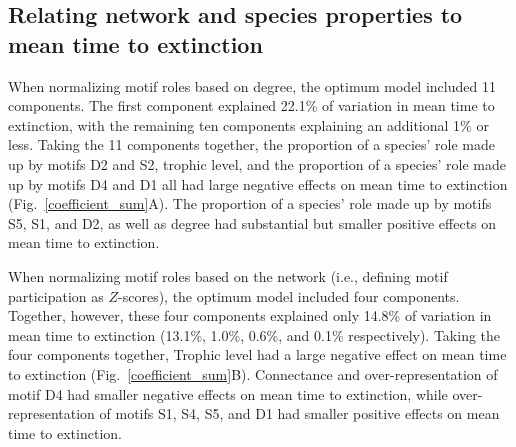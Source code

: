 \documentclass[12pt]{article}
\begin{document}
	\subsection*{Relating network and species properties to mean time to extinction}

		When normalizing motif roles based on degree, the optimum model included 11 components.
		The first component explained 22.1\% of variation in mean time to extinction, with the remaining ten components explaining an additional 1\% or less.
		Taking the 11 components together, the proportion of a species' role made up by motifs D2 and S2, trophic level, and the proportion of a species' role made up by motifs D4 and D1 all had large negative effects on mean time to extinction (Fig.~\ref{coefficient_sum}A).
		The proportion of a species' role made up by motifs S5, S1, and D2, as well as degree had substantial but smaller positive effects on mean time to extinction.


		When normalizing motif roles based on the network (i.e., defining motif participation as $Z$-scores), the optimum model included four components.
		Together, however, these four components explained only 14.8\% of variation in mean time to extinction (13.1\%, 1.0\%, 0.6\%, and 0.1\% respectively).
		Taking the four components together, Trophic level had a large negative effect on mean time to extinction (Fig.~\ref{coefficient_sum}B).
		Connectance and over-representation of motif D4 had smaller negative effects on mean time to extinction, while over-representation of motifs S1, S4, S5, and D1 had smaller positive effects on mean time to extinction.
\end{document}
